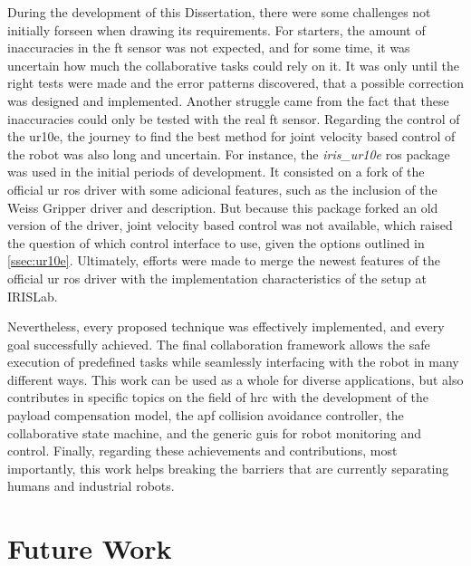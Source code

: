 \par During the development of this Dissertation, there were some challenges not initially forseen when drawing its requirements. For starters, the amount of inaccuracies in the \ac{ft} sensor was not expected, and for some time, it was uncertain how much the collaborative tasks could rely on it. It was only until the right tests were made and the error patterns discovered, that a possible correction was designed and implemented. Another struggle came from the fact that these inaccuracies could only be tested with the real \ac{ft} sensor. Regarding the control of the \ac{ur10e}, the journey to find the best method for joint velocity based control of the robot was also long and uncertain. For instance, the \textit{iris\_ur10e} \ac{ros} package was used in the initial periods of development. It consisted on a fork of the official \ac{ur} \ac{ros} driver with some adicional features, such as the inclusion of the Weiss Gripper driver and description. But because this package forked an old version of the driver, joint velocity based control was not available, which raised the question of which control interface to use, given the options outlined in \autoref{ssec:ur10e}. Ultimately, efforts were made to merge the newest features of the official \ac{ur} \ac{ros} driver with the implementation characteristics of the setup at IRISLab.

\par Nevertheless, every proposed technique was effectively implemented, and every goal successfully achieved. The final collaboration framework allows the safe execution of predefined tasks while seamlessly interfacing with the robot in many different ways. This work can be used as a whole for diverse applications, but also contributes in specific topics on the field of \ac{hrc} with the development of the payload compensation model, the \ac{apf} collision avoidance controller, the collaborative state machine, and the generic \acp{gui} for robot monitoring and control. Finally, regarding these achievements and contributions, most importantly, this work helps breaking the barriers that are currently separating humans and industrial robots.





\section{Future Work}

